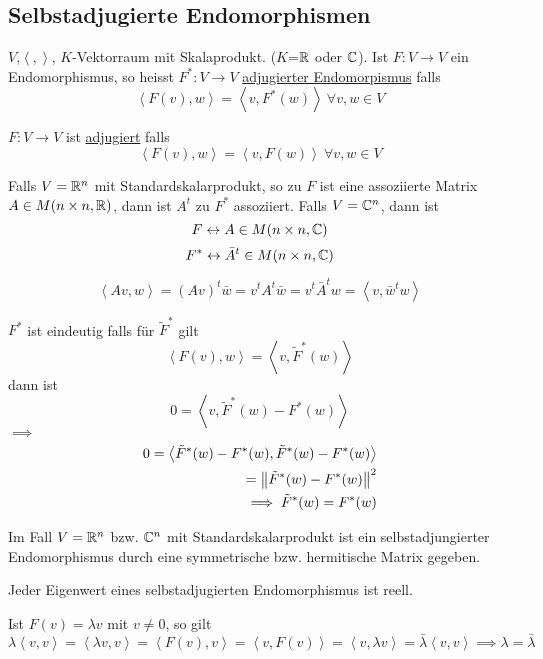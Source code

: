 \subsection{Selbstadjugierte Endomorphismen}
$V$,$\left\langle , \right\rangle$, $K$-Vektorraum mit Skalaprodukt. ($K$=$\mathbb{R}$ oder $\mathbb{C}$). Ist $F:V\to V$ ein Endomorphismus, so heisst $F^*:V\to V$ \underline{adjugierter Endomorpismus} falls 
\[\left\langle F(v),w \right\rangle = \left\langle v,F^*(w) \right\rangle\ \forall v,w\in V\]
\begin{Def}
  $F:V\to V$ ist \underline{adjugiert} falls
  \[\left\langle F(v),w \right\rangle=\left\langle v,F(w) \right\rangle\ \forall v,w\in V\]
\end{Def}
\begin{Eig}
  Falls $V=\mathbb{R}^n$ mit Standardskalarprodukt, so zu $F$ ist eine assoziierte Matrix $A\in M(n\times n,\mathbb{R})$, dann ist $A^t$ zu $F^*$ assoziiert.
  Falls $V=\mathbb{C}^n$, dann ist 
  \[F\leftrightarrow A\in M(n\times n,\mathbb{C})\]
  \[F^*\leftrightarrow \bar{A}^t\in M(n\times n,\mathbb{C})\]
\end{Eig}
\begin{Bew}
  \[\left\langle Av,w \right\rangle=(Av)^t\bar{w}=v^tA^t\bar{w}=v^t\bar{A}^tw=\left\langle v,\bar{w}^tw \right\rangle\]
\end{Bew}
\begin{Bem}
  $F^*$ ist eindeutig falls für $\tilde F^*$ gilt
  \[\left\langle F(v),w \right\rangle=\left\langle v,\tilde F^*(w) \right\rangle\]
  dann ist
  \[0=\left\langle v,\tilde F^*(w)-F^*(w) \right\rangle\]
  $\implies$
  \begin{align*}
    0=\left\langle \tilde F^*(w)-F^*(w),\tilde F^*(w)-F^*(w) \right\rangle\\
    =\left\| \tilde F^*(w)-F^*(w) \right\|^2\\
    \implies \tilde F^*(w)=F^*(w)
  \end{align*}
\end{Bem}
\begin{Faz}
  Im Fall $V=\mathbb{R}^n$ bzw. $\mathbb{C}^n$ mit Standardskalarprodukt ist ein selbstadjungierter Endomorphismus durch eine symmetrische bzw. hermitische Matrix gegeben.
\end{Faz}
\begin{Lem}
  Jeder Eigenwert eines selbstadjugierten Endomorphismus ist reell.
\end{Lem}
\begin{Bew}
  Ist $F(v)=\lambda v$ mit $v\neq 0$, so gilt
  \[\lambda\left\langle v,v \right\rangle=\left\langle \lambda v,v \right\rangle=\left\langle F(v),v \right\rangle=\left\langle v,F(v) \right\rangle=\left\langle v,\lambda v \right\rangle=\bar \lambda\left\langle v,v \right\rangle \implies \lambda=\bar\lambda \]
\end{Bew}
